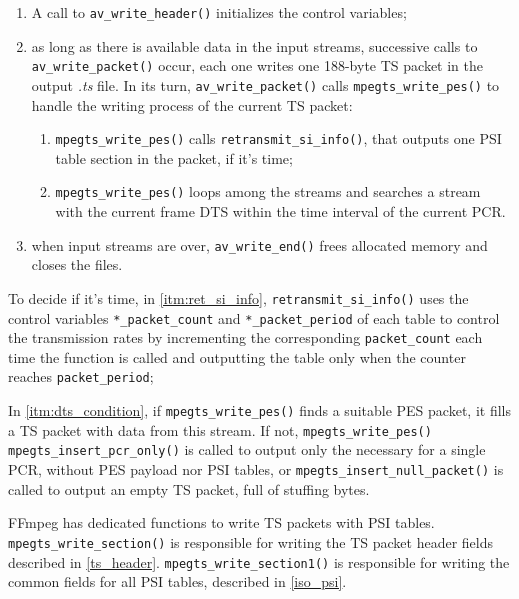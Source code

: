 \documentclass[
	12pt,				%
	openright,			%
	twoside,			%
	a4paper,			%
	brazil,
	french,				%
	english
	]{abntex2}
\begin{document}
\begin{enumerate}
	\item{A call to \texttt{av\_write\_header()} initializes the control variables;}
	\item{as long as there is available data in the input streams, successive calls to \texttt{av\_write\_packet()} occur, each one writes one 188-byte TS packet in the output \textit{.ts} file. In its turn, \texttt{av\_write\_packet()} calls \texttt{mpegts\_write\_pes()} to handle the writing process of the current TS packet:}
	\begin{enumerate}
		\item {\label{itm:ret_si_info} \texttt{mpegts\_write\_pes()} calls  \texttt{retransmit\_si\_info()}, that outputs one PSI table section in the packet, if it's time;}
		\item {\label{itm:dts_condition} \texttt{mpegts\_write\_pes()} loops among the streams and searches a stream with the current frame DTS within the time interval of the current PCR.}
	\end{enumerate}
	\item{when input streams are over, \texttt{av\_write\_end()} frees allocated memory and closes the files.}
\end{enumerate}

To decide if it's time, in \autoref{itm:ret_si_info}, \texttt{retransmit\_si\_info()} uses the control variables \texttt{*\_packet\_count} and \texttt{*\_packet\_period} of each table to control the transmission rates by incrementing the corresponding \texttt{packet\_count} each time the function is called and outputting the table only when the counter reaches \texttt{packet\_period};

In \autoref{itm:dts_condition}, if \texttt{mpegts\_write\_pes()} finds a suitable PES packet, it fills a TS packet with data from this stream. If not, \texttt{mpegts\_write\_pes()} \texttt{mpegts\_insert\_pcr\_only()} is called to output only the necessary for a single PCR, without PES payload nor PSI tables, or \texttt{mpegts\_insert\_null\_packet()} is called to output an empty TS packet, full of stuffing bytes.

FFmpeg has dedicated functions to write TS packets with PSI tables. \texttt{mpegts\_write\_section()} is responsible for writing the TS packet header fields described in \autoref{ts_header}. \texttt{mpegts\_write\_section1()} is responsible for writing the common fields for all PSI tables, described in \autoref{iso_psi}.

\end{document}
